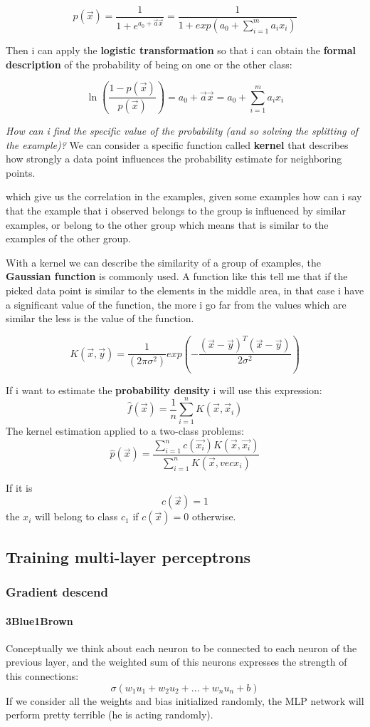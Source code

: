 \documentclass{article}
\begin{document}
$$p(\vec{x})=\frac{1}{1+e^{a_0+\vec{a}\vec{x}}}=\frac{1}{1+exp(a_0+\sum_{i=1}^m a_i x_i)}$$

Then i can apply the \textbf{logistic transformation} so that i can obtain the
\textbf{formal description} of the probability of being on one or the other class:

$$\ln{\left(\frac{1-p(\vec{x})}{p(\vec{x})}\right)}=a_0+\vec{a}\vec{x}=a_0+\sum_{i=1}^m a_i x_i$$


\textit{How can i find the specific value of the probability (and so solving the splitting of the
    example)?}
We can consider a specific function called \textbf{kernel} that describes
how strongly a data point influences the probability estimate for neighboring points.


which give us the correlation
in the examples, given some examples how can i say that the example that i observed
belongs to the group is influenced by similar examples, or belong to the other group
which means that is similar to the examples of the other group.

With a kernel we can describe the similarity of a
group of examples, the \textbf{Gaussian function} is commonly used. A function like this
tell me that if the picked data point is similar to the elements in the middle area, in that
case i have a significant value of the function, the more i go far from the values
which are similar the less is the value of the function.

$$K(\vec{x},\vec{y})=\frac{1}{(2\pi\sigma^2)}exp\left(-\frac{(\vec{x}-\vec{y})^T(\vec{x}-\vec{y})}{2\sigma^2}\right)$$


If i want to estimate the \textbf{probability density} i will use this expression:
$$\hat{f} (\vec{x}) = \frac{1}{n} \sum_{i=1}^n K(\vec{x},\vec{x}_i)$$
The kernel estimation applied to a two-class problems:
$$\hat{p}(\vec{x})=\frac{\sum_{i=1}^n c(\vec{x_i})K(\vec{x},\vec{x_i})}{\sum_{i=1}^n K(\vec{x},vec{x_i})}$$

If it is $$c(\vec{x})=1$$ the $x_i$ will belong to class $c_1$ if $c(\vec{x})=0$ otherwise.

\subsection{Training multi-layer perceptrons}
\subsubsection{Gradient descend}
\paragraph{3Blue1Brown}
Conceptually we think about each neuron to be connected to each neuron of the previous layer,
and the weighted sum of this neurons expresses the strength of this connections:
$$\sigma(w_1u_1+w_2u_2+...+w_nu_n+b)$$
If we consider all the weights and bias initialized randomly, the MLP network will perform
pretty terrible (he is acting randomly).
\end{document}
